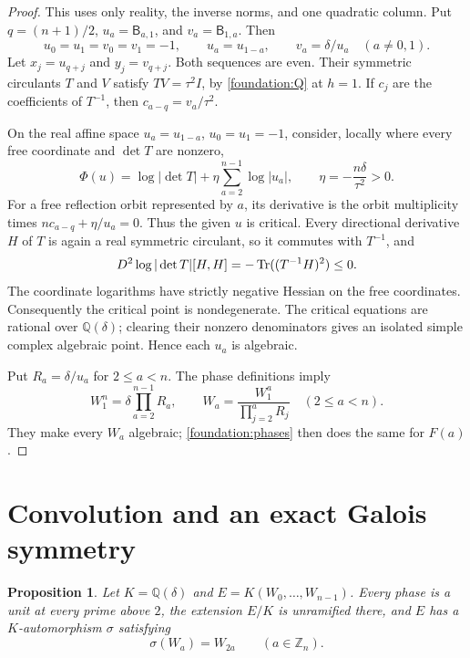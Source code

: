 \documentclass[11pt]{article}
\numberwithin{equation}{section}
\newtheorem{proposition}[theorem]{Proposition}
\theoremstyle{definition}
\theoremstyle{remark}
\begin{document}
\begin{proof}
This uses only reality, the inverse norms, and one quadratic column.
Put $q=(n+1)/2$, $u_a=\mathsf B_{a,1}$, and
$v_a=\mathsf B_{1,a}$. Then
\[
 u_0=u_1=v_0=v_1=-1,\qquad u_a=u_{1-a},\qquad
 v_a=\delta/u_a\quad(a\ne0,1).
\]
Let $x_j=u_{q+j}$ and $y_j=v_{q+j}$. Both sequences are even.
Their symmetric circulants $T$ and $V$ satisfy
$TV=\tau^2 I$, by \eqref{foundation:Q} at $h=1$.
If $c_j$ are the coefficients of $T^{-1}$, then
$c_{a-q}=v_a/\tau^2$.

On the real affine space $u_a=u_{1-a}$, $u_0=u_1=-1$,
consider, locally where every free coordinate and $\det T$ are nonzero,
\[
 \Phi(u)=\log|\det T|+\eta\sum_{a=2}^{n-1}\log|u_a|,
 \qquad \eta=-\frac{n\delta}{\tau^2}>0.
\]
For a free reflection orbit represented by $a$, its derivative is
the orbit multiplicity times
$nc_{a-q}+\eta/u_a=0$. Thus the given $u$ is critical.
Every directional derivative $H$ of $T$ is again a real symmetric
circulant, so it commutes with $T^{-1}$, and
\[
 D^2\log|\det T|[H,H]=-\mathop{\rm Tr}((T^{-1}H)^2)\leq0.
\]
The coordinate logarithms have strictly negative Hessian on the free
coordinates. Consequently the critical point is nondegenerate.
The critical equations are rational over $\mathbb Q(\delta)$;
clearing their nonzero denominators gives an isolated simple complex
algebraic point. Hence each $u_a$ is algebraic.

Put $R_a=\delta/u_a$ for $2\leq a<n$. The phase definitions imply
\[
 W_1^n=\delta\prod_{a=2}^{n-1}R_a,\qquad
 W_a=\frac{W_1^a}{\prod_{j=2}^{a}R_j}\quad(2\leq a<n).
\]
They make every $W_a$ algebraic; \eqref{foundation:phases} then does
the same for $F(a)$.
\end{proof}

\section{Convolution and an exact Galois symmetry}

\begin{proposition}\label{fd:frobenius}
Let $K=\mathbb Q(\delta)$ and $E=K(W_0,\ldots,W_{n-1})$.
Every phase is a unit at every prime above $2$, the extension $E/K$
is unramified there, and $E$ has a $K$-automorphism $\sigma$ satisfying
\begin{equation}\label{foundation:exact-frobenius}
 \sigma(W_a)=W_{2a}\qquad(a\in\mathbb Z_n).
\end{equation}
\end{proposition}
\end{document}
